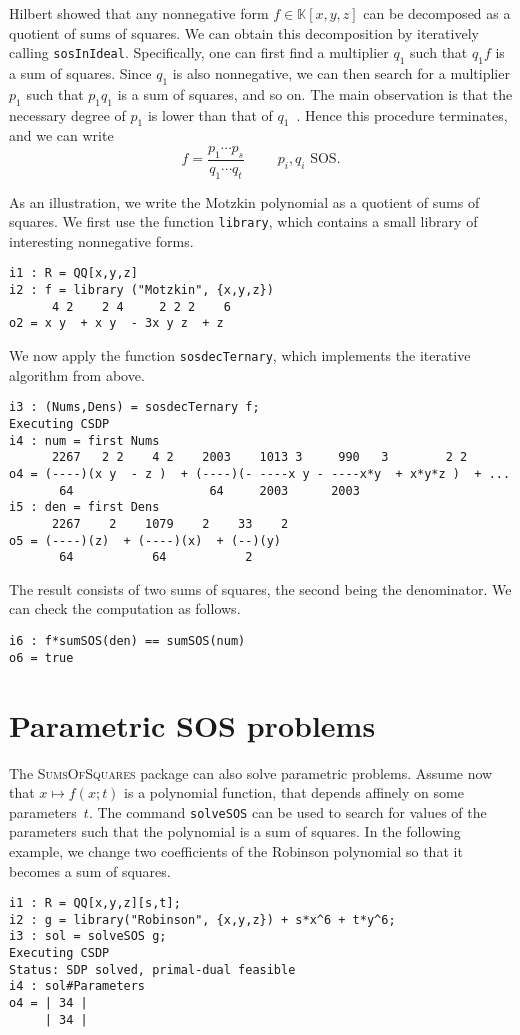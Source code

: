 \documentclass[11pt]{amsart}
\theoremstyle{plain}%
\theoremstyle{definition}
\theoremstyle{remark}
\newcommand{\SOS}{\textsc{SumsOfSquares}\xspace}
\newcommand{\kk}{\mathbb{K}}
\begin{document}
Hilbert showed that any nonnegative form $f\in \kk[x,y,z]$ can be decomposed as a quotient of sums of squares.
We can obtain this decomposition by iteratively calling \verb|sosInIdeal|.
Specifically, one can first find a multiplier $q_{1}$ such that $q_{1}f$ is a sum of squares.
Since $q_1$ is also nonnegative, we can then search for a multiplier $p_{1}$ such that $p_{1}q_{1}$ is a sum of squares, and so on.
The main observation is that the necessary degree of $p_{1}$ is lower than that of $q_{1}$~\cite{de2004products}.
Hence this procedure terminates, and we can write
\[
  f = \frac{p_{1}\cdots p_{s}}{q_{1}\cdots q_{t}} \qquad \text {
    $p_{i},q_{i}$ SOS}.
\]

As an illustration, we write the Motzkin polynomial as a quotient of sums of squares.
We first use the function \verb|library|, which contains a small library of interesting nonnegative forms.
{\small
\begin{verbatim}
i1 : R = QQ[x,y,z]
i2 : f = library ("Motzkin", {x,y,z})
      4 2    2 4     2 2 2    6
o2 = x y  + x y  - 3x y z  + z
\end{verbatim}
}
\noindent
We now apply the function \verb|sosdecTernary|, which implements the iterative algorithm from above.
{\small
\begin{verbatim}
i3 : (Nums,Dens) = sosdecTernary f;
Executing CSDP
i4 : num = first Nums
      2267   2 2    4 2    2003    1013 3     990   3        2 2    
o4 = (----)(x y  - z )  + (----)(- ----x y - ----x*y  + x*y*z )  + ... 
       64                   64     2003      2003                 
i5 : den = first Dens
      2267    2    1079    2    33    2
o5 = (----)(z)  + (----)(x)  + (--)(y)
       64           64           2
\end{verbatim}
}
\noindent
The result consists of two sums of squares, the second being the denominator.
We can check the computation as follows.
{\small
\begin{verbatim}
i6 : f*sumSOS(den) == sumSOS(num)
o6 = true
\end{verbatim}
}

\section{Parametric SOS problems}

The \SOS package can also solve parametric problems.
Assume now that $x \mapsto f(x;t)$ is a polynomial function, that depends affinely on some parameters~$t$.
The command \verb|solveSOS| can be used to search for values of the parameters such that the polynomial is a sum of squares.
In the following example, we change two coefficients of the Robinson polynomial so that it becomes a sum of squares.
{\small
\begin{verbatim}
i1 : R = QQ[x,y,z][s,t];
i2 : g = library("Robinson", {x,y,z}) + s*x^6 + t*y^6;
i3 : sol = solveSOS g;
Executing CSDP
Status: SDP solved, primal-dual feasible
i4 : sol#Parameters
o4 = | 34 |
     | 34 |
\end{verbatim}
}
\end{document}
